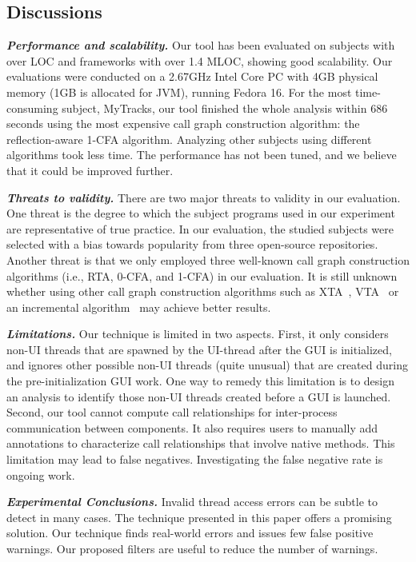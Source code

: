 \subsection{Discussions}

\noindent \textbf{\textit{Performance and scalability.}} Our tool
has been evaluated on \subnum subjects with over \totaloc LOC and frameworks
with over 1.4 MLOC, showing good scalability. Our evaluations
were conducted on a 2.67GHz Intel Core PC with 4GB
physical memory (1GB is allocated for JVM), running Fedora 16.
For the most time-consuming subject, MyTracks, our tool finished the whole analysis
within 686 seconds using the most expensive call graph construction
algorithm: the reflection-aware 1-CFA algorithm. Analyzing
other subjects using different algorithms took less time.
The performance has not been tuned, and we believe
that it could be improved further.



\vspace{1mm}

\noindent \textbf{\textit{Threats to validity.}}
There are two major threats to validity in our evaluation. 
One threat is the degree to which the subject programs
used in our experiment are representative of true practice.
In our evaluation, the studied subjects were selected with a bias towards popularity from
three open-source repositories. Another threat is that we only employed three
well-known call graph construction algorithms (i.e., RTA, 0-CFA, and 1-CFA) 
in our evaluation. It is still unknown whether using other 
call graph construction algorithms such as XTA~\cite{xta}, VTA~\cite{Sundaresan:2000} or
an incremental algorithm~\cite{inccg} may achieve better results.


\vspace{1mm}

\noindent \textbf{\textit{Limitations.}}
Our technique is limited in two aspects. First, it only considers
non-UI threads that are spawned by the UI-thread after the GUI
is initialized, and ignores other possible non-UI threads (quite unusual)
that are created during the pre-initialization GUI work. One way
to remedy this limitation is to design an analysis to identify
those non-UI threads created before a GUI is launched.
Second, our tool cannot compute call relationships
for inter-process communication between components. It also
requires users to manually add annotations to characterize
call relationships that involve native methods. This limitation
may lead to false negatives. Investigating the false negative
rate is ongoing work.


\vspace{1mm}

\noindent \textbf{\textit{Experimental Conclusions.}}
Invalid thread access errors  can be subtle to detect in many cases.
The technique presented in this paper offers a promising solution.
Our technique finds real-world errors and issues
few false positive warnings. Our
proposed filters are useful to reduce the number of warnings.

